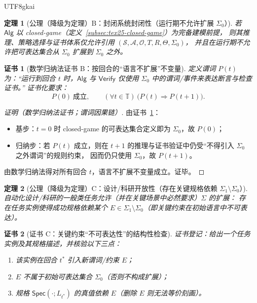 \documentclass[12pt]{article}
\newtheorem{theorem}{定理}[section]
\newtheorem{Certificate}{证书}[section]
\begin{document}
\begin{CJK*}{UTF8}{gkai}
\begin{theorem}[公理（降级为定理）B：封闭系统封闭性（运行期不允许扩展 $\Sigma_0$）]
\label{thm:tex25-ax-b-closure}
若 $\mathsf{Alg}$ 以 closed-game（定义~\ref{subsec:tex25-closed-game}）为完备建模前提，
则其推理、策略选择与证书体系仅允许引用 $(\mathcal{S},\mathcal{A},\mathcal{O},T,R,\Theta,\Sigma_0)$，
并且在运行期不允许把可表达集合从 $\Sigma_0$ 扩展到 $\Sigma_0$ 之外。
\end{theorem}

\begin{Certificate}[数学归纳法证书 B：按回合的“语言不扩展”不变量]
\label{cert:tex25-ax-b-closure}
定义谓词 $P(t)$ 为：“运行到回合 $t$ 时，$\mathsf{Alg}$ 与 $\mathsf{Verify}$ 仅使用 $\Sigma_0$ 中的谓词/事件来表达断言与检查证书。”
证书化要求：
\[
  P(0)\ \text{成立},\qquad
  (\forall t\in\mathbb{T})\ \bigl(P(t)\Rightarrow P(t+1)\bigr).
\]
\end{Certificate}

\begin{proof}[证明（数学归纳法证书；谓词因果链）]
由证书~\ref{cert:tex25-ax-b-closure}：
\begin{itemize}
  \item 基步：$t=0$ 时 closed-game 的可表达集合定义即为 $\Sigma_0$，故 $P(0)$；
  \item 归纳步：若 $P(t)$ 成立，则在 $t+1$ 的推理与证书验证中仍受“不得引入 $\Sigma_0$ 之外谓词”的规则约束，
  因而仍只使用 $\Sigma_0$，故 $P(t+1)$。
\end{itemize}
由数学归纳法得对所有回合 $t$，语言不扩展不变量成立。证毕。
\end{proof}

\begin{theorem}[公理（降级为定理）C：设计/科研开放性（存在关键规格依赖 $\Sigma_1\setminus\Sigma_0$）]
\label{thm:tex25-ax-c-openness}
自动化设计/科研的一般类任务允许（并在关键场景中必然要求）$\Sigma$ 的扩展：
存在任务实例使得成功规格依赖某个 $E\in\Sigma_1\setminus\Sigma_0$（即关键约束在初始语言中不可表达）。
\end{theorem}

\begin{Certificate}[证书 C：关键约束“不可表达性”的结构性检查]
\label{cert:tex25-ax-c-openness}
证书登记：给出一个任务实例及其规格描述，并核验以下三点：
\begin{enumerate}
  \item 该实例在回合 $t^\ast$ 引入新谓词/约束 $E$；
  \item $E$ 不属于初始可表达集合 $\Sigma_0$（否则不构成扩展）；
  \item 规格 $\mathsf{Spec}(\cdot;L_{t^\ast})$ 的真值依赖 $E$（删除 $E$ 则无法等价刻画）。
\end{enumerate}
\end{Certificate}


\end{CJK*}
\end{document}
